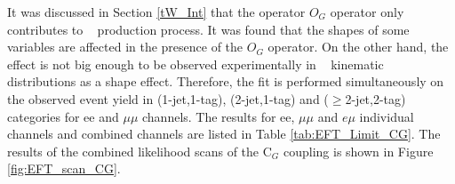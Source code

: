 It was discussed in Section \ref{tW_Int} that the operator $O_{G}$ operator only contributes to \ttbar~ production process.
It was found that the shapes of some variables are affected in the presence of the $O_{G}$ operator.
On the other hand, the effect is not  big enough to be observed experimentally in \ttbar~ kinematic distributions as a shape effect.
Therefore, the fit is  performed simultaneously on the observed event yield in  (1-jet,1-tag), (2-jet,1-tag) and ($\geq$2-jet,2-tag) categories for ee and $\mu\mu$ channels.
The results for ee, $\mu\mu$ and $e\mu$ individual channels and combined channels are listed in  Table \ref{tab:EFT_Limit_CG}.
The results of the combined likelihood scans of the C$_{G}$ coupling is shown in Figure \ref{fig:EFT_scan_CG}.


\begin{table}[h]
\centering
{}
\caption{Summary of allowed 68\% CL and 95\% CL intervals on C$_{G}$ effective coupling  obtained in $ee$, $e\mu$, $\mu\mu$ and combined channels ($\Lambda = 1 TeV$).}
\label{tab:EFT_Limit_CG}
\end{table}

